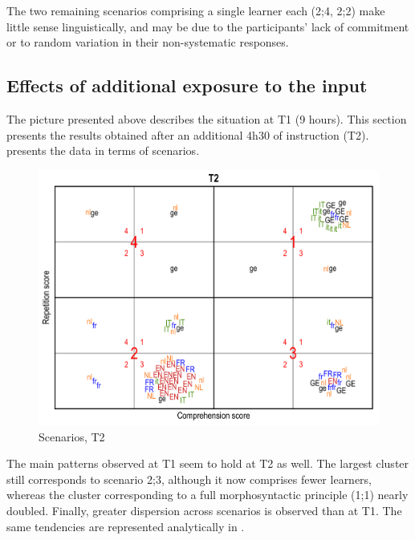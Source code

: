 The two remaining scenarios comprising a single learner each (2;4, 2;2) make little sense linguistically, and may be due to the participants’ lack of commitment or to random variation in their non-systematic responses. 

\subsection{Effects of additional exposure to the input}\label{sec:06:3.1}

The picture presented above describes the situation at T1 (9 hours). This section presents the results obtained after an additional 4h30 of instruction (T2).  presents the data in terms of scenarios.

\begin{figure}
    \includegraphics[width=\textwidth]{figures/06-6.pdf}
    \caption{Scenarios, T2}
    \label{fig:06:6}
\end{figure}

The main patterns observed at T1 seem to hold at T2 as well. The largest cluster still corresponds to scenario 2;3, although it now comprises fewer learners, whereas the cluster corresponding to a full morphosyntactic principle (1;1) nearly doubled. Finally, greater dispersion across scenarios is observed than at T1. The same tendencies are represented analytically in .

